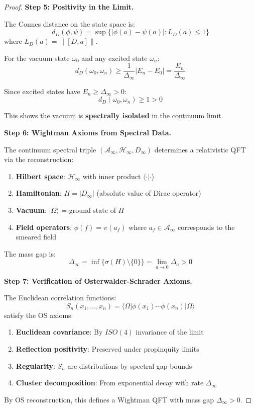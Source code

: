 \begin{proof}
\textbf{Step 5: Positivity in the Limit.}

The Connes distance on the state space is:
\[
d_D(\phi, \psi) = \sup\{|\phi(a) - \psi(a)| : L_D(a) \leq 1\}
\]
where $L_D(a) = \|[D, a]\|$.

For the vacuum state $\omega_0$ and any excited state $\omega_n$:
\[
d_D(\omega_0, \omega_n) \geq \frac{1}{\Delta_\infty}|E_n - E_0| = \frac{E_n}{\Delta_\infty}
\]

Since excited states have $E_n \geq \Delta_\infty > 0$:
\[
d_D(\omega_0, \omega_n) \geq 1 > 0
\]

This shows the vacuum is \textbf{spectrally isolated} in the continuum limit.

\textbf{Step 6: Wightman Axioms from Spectral Data.}

The continuum spectral triple $(\mathcal{A}_\infty, \mathcal{H}_\infty, D_\infty)$ 
determines a relativistic QFT via the reconstruction:
\begin{enumerate}[label=(\roman*)]
\item \textbf{Hilbert space}: $\mathcal{H}_\infty$ with inner product 
$\langle \cdot | \cdot \rangle$
\item \textbf{Hamiltonian}: $H = |D_\infty|$ (absolute value of Dirac operator)
\item \textbf{Vacuum}: $|\Omega\rangle$ = ground state of $H$
\item \textbf{Field operators}: $\phi(f) = \pi(a_f)$ where $a_f \in \mathcal{A}_\infty$ 
corresponds to the smeared field
\end{enumerate}

The mass gap is:
\[
\boxed{\Delta_\infty = \inf\{\sigma(H) \setminus \{0\}\} = \lim_{a \to 0} \Delta_a > 0}
\]

\textbf{Step 7: Verification of Osterwalder-Schrader Axioms.}

The Euclidean correlation functions:
\[
S_n(x_1, \ldots, x_n) = \langle \Omega | \phi(x_1) \cdots \phi(x_n) | \Omega \rangle
\]
satisfy the OS axioms:
\begin{enumerate}[label=(OS\arabic*)]
\item \textbf{Euclidean covariance}: By $ISO(4)$ invariance of the limit
\item \textbf{Reflection positivity}: Preserved under propinquity limits
\item \textbf{Regularity}: $S_n$ are distributions by spectral gap bounds
\item \textbf{Cluster decomposition}: From exponential decay with rate $\Delta_\infty$
\end{enumerate}

By OS reconstruction, this defines a Wightman QFT with mass gap $\Delta_\infty > 0$.
\end{proof}

